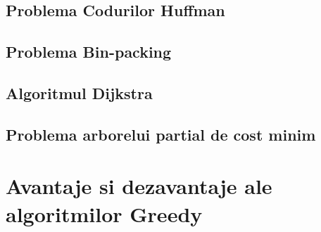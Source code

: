 \subsection{Problema Codurilor Huffman}
\subsection{Problema Bin-packing}
\subsection{Algoritmul Dijkstra}
\subsection{Problema arborelui partial de cost minim}

\section{Avantaje si dezavantaje ale algoritmilor Greedy}				



